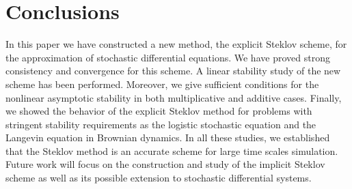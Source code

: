 \section{Conclusions}\label{sec6}
In this paper we have constructed a new method, the explicit Steklov scheme, for the
approximation of stochastic differential equations. We have proved strong consistency and
convergence for this scheme. A linear stability study  of the new scheme has been
performed. Moreover, we give sufficient conditions for the nonlinear asymptotic stability
in both multiplicative and additive cases. Finally, we showed the behavior of the explicit
Steklov method for  problems  with stringent stability requirements as the logistic
stochastic equation and the Langevin equation in Brownian dynamics. In all these studies,
we established that the Steklov method is an accurate scheme for  large time scales
simulation. Future work will focus on the construction and study  of the implicit Steklov
scheme as well as its possible extension to stochastic differential systems.
